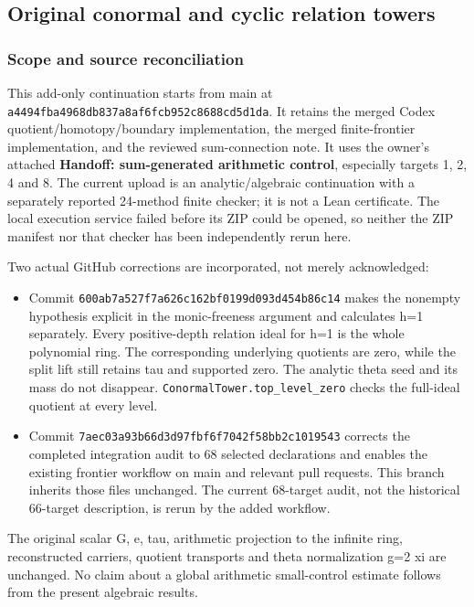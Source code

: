 \subsection{Original conormal and cyclic relation
towers}\label{conormal_cyclic_pr21:original-conormal-and-cyclic-relation-towers}

\subsubsection{Scope and source reconciliation}\label{conormal_cyclic_pr21:scope-and-source-reconciliation}

This add-only continuation starts from main at \nolinkurl{a4494fba4968db837a8af6fcb952c8688cd5d1da}. It
retains the merged Codex quotient/homotopy/boundary implementation, the merged finite-frontier
implementation, and the reviewed sum-connection note. It uses the owner's attached \textbf{Handoff:
sum-generated arithmetic control}, especially targets 1, 2, 4 and 8. The current upload is an
analytic/algebraic continuation with a separately reported 24-method finite checker; it is not a
Lean certificate. The local execution service failed before its ZIP could be opened, so neither the
ZIP manifest nor that checker has been independently rerun here.

Two actual GitHub corrections are incorporated, not merely acknowledged:

\begin{itemize}
\tightlist
\item
  Commit \nolinkurl{600ab7a527f7a626c162bf0199d093d454b86c14} makes the nonempty hypothesis explicit in
  the monic-freeness argument and calculates h=1 separately. Every positive-depth relation ideal for
  h=1 is the whole polynomial ring. The corresponding underlying quotients are zero, while the split
  lift still retains tau and supported zero. The analytic theta seed and its mass do not disappear.
  \nolinkurl{ConormalTower.top_level_zero} checks the full-ideal quotient at every level.
\item
  Commit \nolinkurl{7aec03a93b66d3d97fbf6f7042f58bb2c1019543} corrects the completed integration audit
  to 68 selected declarations and enables the existing frontier workflow on main and relevant pull
  requests. This branch inherits those files unchanged. The current 68-target audit, not the
  historical 66-target description, is rerun by the added workflow.
\end{itemize}

The original scalar G, e, tau, arithmetic projection to the infinite ring, reconstructed carriers,
quotient transports and theta normalization g=2 xi are unchanged. No claim about a global arithmetic
small-control estimate follows from the present algebraic results.

